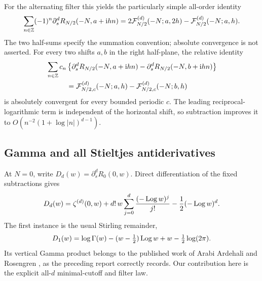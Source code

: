 For the alternating filter this yields the particularly simple
all-order identity
\begin{equation}\label{eq:alternating-all-jets}
 \sum_{n\in\mathbb Z}(-1)^n
      \partial_s^dR_{N/2}(-N,a+\mathrm i hn)
 =
 2{\cal F}_{N/2}^{(d)}(-N;a,2h)
   -{\cal F}_{N/2}^{(d)}(-N;a,h).
\end{equation}
The two half-sums specify the summation convention; absolute
convergence is not asserted. For every two shifts \(a,b\) in the
right half-plane, the relative identity
\begin{equation}\label{eq:relative-lattice}
 \begin{split}
 &\sum_{n\in\mathbb Z}c_n
 \left\{\partial_s^dR_{N/2}(-N,a+\ii hn)
       -\partial_s^dR_{N/2}(-N,b+\ii hn)\right\}\\
 &\hspace{10mm}
 ={\cal F}_{N/2,c}^{(d)}(-N;a,h)
       -{\cal F}_{N/2,c}^{(d)}(-N;b,h)
 \end{split}
\end{equation}
is absolutely convergent for every bounded periodic \(c\).
The leading reciprocal-logarithmic term is independent of the
horizontal shift, so subtraction improves it to
\(O(n^{-2}(1+\log|n|)^{d-1})\).

\subsection{Gamma and all Stieltjes antiderivatives}

At \(N=0\), write \(D_d(w)=\partial_s^dR_0(0,w)\). Direct
differentiation of the fixed subtractions gives
\begin{equation}\label{eq:Dd-explicit}
 D_d(w)=\zeta^{(d)}(0,w)
       +d!\,w\sum_{j=0}^{d}\frac{(-\operatorname{Log} w)^j}{j!}
       -\frac12(-\operatorname{Log} w)^d.
\end{equation}
The first instance is the usual Stirling remainder,
\[
 D_1(w)=\log\Gamma(w)-(w-\tfrac12)\operatorname{Log} w+w-\tfrac12\log(2\pi).
\]
Its vertical Gamma product belongs to the published work of
Arabi Ardehali and Rosengren \cite{ArdehaliRosengren}, as the
preceding report correctly records. Our contribution here is the
explicit all-\(d\) minimal-cutoff and filter law.


